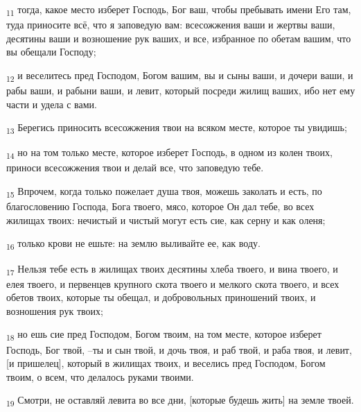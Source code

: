 \begin{tcolorbox}
\textsubscript{11} тогда, какое место изберет Господь, Бог ваш, чтобы пребывать имени Его там, туда приносите всё, что я заповедую вам: всесожжения ваши и жертвы ваши, десятины ваши и возношение рук ваших, и все, избранное по обетам вашим, что вы обещали Господу;
\end{tcolorbox}
\begin{tcolorbox}
\textsubscript{12} и веселитесь пред Господом, Богом вашим, вы и сыны ваши, и дочери ваши, и рабы ваши, и рабыни ваши, и левит, который посреди жилищ ваших, ибо нет ему части и удела с вами.
\end{tcolorbox}
\begin{tcolorbox}
\textsubscript{13} Берегись приносить всесожжения твои на всяком месте, которое ты увидишь;
\end{tcolorbox}
\begin{tcolorbox}
\textsubscript{14} но на том только месте, которое изберет Господь, в одном из колен твоих, приноси всесожжения твои и делай все, что заповедую тебе.
\end{tcolorbox}
\begin{tcolorbox}
\textsubscript{15} Впрочем, когда только пожелает душа твоя, можешь заколать и есть, по благословению Господа, Бога твоего, мясо, которое Он дал тебе, во всех жилищах твоих: нечистый и чистый могут есть сие, как серну и как оленя;
\end{tcolorbox}
\begin{tcolorbox}
\textsubscript{16} только крови не ешьте: на землю выливайте ее, как воду.
\end{tcolorbox}
\begin{tcolorbox}
\textsubscript{17} Нельзя тебе есть в жилищах твоих десятины хлеба твоего, и вина твоего, и елея твоего, и первенцев крупного скота твоего и мелкого скота твоего, и всех обетов твоих, которые ты обещал, и добровольных приношений твоих, и возношения рук твоих;
\end{tcolorbox}
\begin{tcolorbox}
\textsubscript{18} но ешь сие пред Господом, Богом твоим, на том месте, которое изберет Господь, Бог твой, --ты и сын твой, и дочь твоя, и раб твой, и раба твоя, и левит, [и пришелец], который в жилищах твоих, и веселись пред Господом, Богом твоим, о всем, что делалось руками твоими.
\end{tcolorbox}
\begin{tcolorbox}
\textsubscript{19} Смотри, не оставляй левита во все дни, [которые будешь жить] на земле твоей.
\end{tcolorbox}
